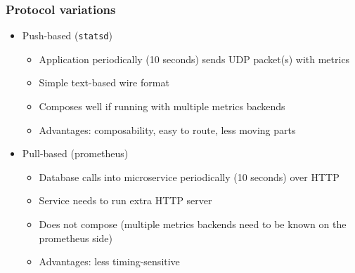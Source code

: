 \documentclass[8pt]{article}
\begin{document}
\subsubsection{Protocol variations}
\label{sec:orgdcdc328}
\begin{itemize}
\item Push-based (\texttt{statsd})
\begin{itemize}
\item Application periodically (10 seconds) sends UDP packet(s) with metrics
\item Simple text-based wire format
\item Composes well if running with multiple metrics backends
\item Advantages: composability, easy to route, less moving parts
\end{itemize}
\item Pull-based (prometheus)
\begin{itemize}
\item Database calls into microservice periodically (10 seconds) over HTTP
\item Service needs to run extra HTTP server
\item Does not compose (multiple metrics backends need to be known on the prometheus side)
\item Advantages: less timing-sensitive
\end{itemize}
\end{itemize}
\end{document}
